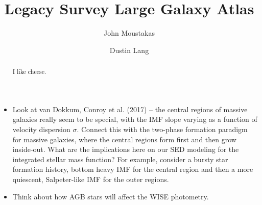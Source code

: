 \documentclass[preprint]{aastex61}
\begin{document}
\title{Legacy Survey Large Galaxy Atlas}

\author{John Moustakas}

\author{Dustin Lang} 

\begin{abstract}
I like cheese.
\end{abstract}









\begin{itemize}

\item{Look at van Dokkum, Conroy et al. (2017) -- the central regions of massive
  galaxies really seem to be special, with the IMF slope varying as a function
  of velocity dispersion $\sigma$.  Connect this with the two-phase formation
  paradigm for massive galaxies, where the central regions form first and then
  grow inside-out.  What are the implications here on our SED modeling for the
  integrated stellar mass function?  For example, consider a bursty star
  formation history, bottom heavy IMF for the central region and then a more
  quiescent, Salpeter-like IMF for the outer regions.}

\item{Think about how AGB stars will affect the WISE photometry.}

\end{itemize}




%
%
%
\end{document}
